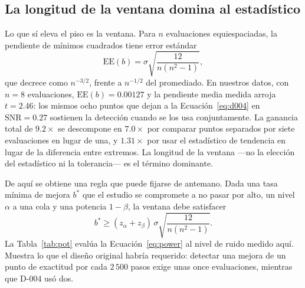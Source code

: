\documentclass[jou,11pt,donotrepeattitle]{apa7}
\begin{document}
\subsection{La longitud de la ventana domina al estad\'istico}

Lo que s\'i eleva el piso es la ventana. Para $n$ evaluaciones equiespaciadas, la pendiente de
m\'inimos cuadrados tiene error est\'andar
%
\begin{equation}
\mathrm{EE}(b) = \sigma \sqrt{\frac{12}{n(n^{2}-1)}} ,
\label{eq:se}
\end{equation}
%
que decrece como $n^{-3/2}$, frente a $n^{-1/2}$ del promediado. En nuestros datos, con $n = 8$
evaluaciones, $\mathrm{EE}(b) = 0.00127$ y la pendiente media medida arroja $t = 2.46$: los mismos
ocho puntos que dejan a la Ecuaci\'on~\ref{eq:d004} en $\mathrm{SNR} = 0.27$ sostienen la
detecci\'on cuando se los usa conjuntamente. La ganancia total de $9.2\times$ se descompone en
$7.0\times$ por comparar puntos separados por siete evaluaciones en lugar de una, y $1.31\times$
por usar el estad\'istico de tendencia en lugar de la diferencia entre extremos. La longitud de
la ventana ---no la elecci\'on del estad\'istico ni la tolerancia--- es el t\'ermino dominante.

De aqu\'i se obtiene una regla que puede fijarse de antemano. Dada una tasa m\'inima de mejora
$b^{*}$ que el estudio se compromete a no pasar por alto, un nivel $\alpha$ a una cola y una
potencia $1 - \beta$, la ventana debe satisfacer
%
\begin{equation}
b^{*} \geq (z_{\alpha} + z_{\beta})\, \sigma \sqrt{\frac{12}{n(n^{2}-1)}} .
\label{eq:power}
\end{equation}
%
La Tabla~\ref{tab:pot} eval\'ua la Ecuaci\'on~\ref{eq:power} al nivel de ruido medido aqu\'i.
Muestra lo que el dise\~no original habr\'ia requerido: detectar una mejora de un punto de
exactitud por cada $2\,500$ pasos exige unas once evaluaciones, mientras que D-004 us\'o dos.
\end{document}
